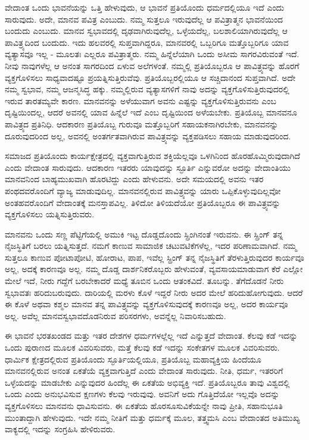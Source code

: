 ವೇದಾಂತ ಒಂದು ಭಾವನೆಯನ್ನು ಒತ್ತಿ ಹೇಳುವುದು, ಆ ಭಾವನೆ ಪ್ರತಿಯೊಂದು ಧರ್ಮದಲ್ಲಿಯೂ ಇದೆ ಎಂದು ಸಾರುವುದು. ಅದೇ, ಮಾನವ ಪವಿತ್ರ ಎಂಬುದು. ನಮ್ಮ ಸುತ್ತಲೂ ಇರುವುದೆಲ್ಲ ಆ ಪವಿತ್ರಾತ್ಮನ ಭಾವನೆಯಿಂದ ಬಂದುದು ಎಂಬುದು. ಮಾನವ ಸ್ವಭಾವದಲ್ಲಿ ದೃಢವಾಗಿರುವುದೆಲ್ಲ, ಒಳ್ಳೆಯದೆಲ್ಲ, ಬಲಶಾಲಿಯಾಗಿರುವುದೆಲ್ಲ ಆ ಪಾವಿತ್ರ್ಯದಿಂದ ಬಂದುದು. ಇದು ಹಲವರಲ್ಲಿ ಸುಪ್ತವಾಗಿದ್ದರೂ, ಮಾನವರಲ್ಲಿ ಒಬ್ಬರಿಗೂ ಮತ್ತೊಬ್ಬರಿಗೂ ಯಾವ ವ್ಯತ್ಯಾಸವೂ ಇಲ್ಲ - ಮೂಲತಃ ಎಲ್ಲರೂ ಪವಿತ್ರಾತ್ಮರು. ನಮ್ಮ ಹಿನ್ನೆಲೆಯಾಗಿ ಒಂದು ಅಸೀಮ ಸಾಗರವಿರುವಂತೆ ಇದೆ. ನೀವು ನಾವುಗಳೆಲ್ಲ ಆ ಅನಂತ ಸಾಗರದಿಂದ ಏಳುವ ಅಲೆಗಳಂತೆ. ನಮ್ಮಲ್ಲಿ ಪ್ರತಿಯೊಬ್ಬರೂ ಆ ಪಾವಿತ್ರ್ಯವನ್ನು ಹೊರಗೆ ವ್ಯಕ್ತಗೊಳಿಸಲು ಸಾಧ್ಯವಾದಷ್ಟೂ ಪ್ರಯತ್ನಿಸುತ್ತಿರುವೆವು. ಪ್ರತಿಯೊಬ್ಬರಲ್ಲಿಯೂ ಆ ಸಚ್ಚಿದಾನಂದ ಸುಪ್ತವಾಗಿದೆ. ಅದೇ ನಮ್ಮ ಸ್ವಭಾವ, ನಮ್ಮ ಆಜನ್ಮಸಿದ್ಧ ಹಕ್ಕು. ನಮ್ಮಲ್ಲಿರುವ ವ್ಯತ್ಯಾಸಗಳಿಗೆ ನಾವು ಅದನ್ನು ವ್ಯಕ್ತಗೊಳಿಸುತ್ತಿರುವುದರಲ್ಲಿ ಇರುವ ತಾರತಮ್ಯವೇ ಕಾರಣ. ಮಾನವನನ್ನು ಅಳೆಯುವಾಗ ಅವನು ಎಷ್ಟನ್ನು ವ್ಯಕ್ತಗೊಳಿಸುತ್ತಿರುವನು ಎಂಬ ದೃಷ್ಟಿಯಿಂದಲ್ಲ, ಆದರೆ ಅವನಲ್ಲಿ ಯಾವ ಹಿನ್ನೆಲೆ ಇದೆ ಎಂಬ ದೃಷ್ಟಿಯಿಂದ ಅಳೆಯಬೇಕು. ಪ್ರತಿಯೊಬ್ಬ ಮಾನವನೂ ಪಾವಿತ್ರ್ಯದ ಪ್ರತಿನಿಧಿ. ಆದಕಾರಣ ಪ್ರತಿಯೊಬ್ಬ ಗುರುವೂ ಮತ್ತೊಬ್ಬರಿಗೆ ಸಹಾಯಕನಾಗಿರಬೇಕು, ಮಾನವನನ್ನು ದೂರುವುದರಿಂದ ಅಲ್ಲ, ಅವನಲ್ಲಿ ಅಂತರ್ಗತವಾಗಿರುವ ಪಾವಿತ್ರ್ಯವನ್ನು ವ್ಯಕ್ತಪಡಿಸಲು ಸಹಾಯ ಮಾಡುವುದರಿಂದ.

ಸಮಾಜದ ಪ್ರತಿಯೊಂದು ಕಾರ್ಯಕ್ಷೇತ್ರದಲ್ಲಿ ವ್ಯಕ್ತವಾಗುತ್ತಿರುವ ಶಕ್ತಿಯೆಲ್ಲವೂ ಒಳಗಿನಿಂದ ಹೊರಹೊಮ್ಮಿರುವುದಾಗಿದೆ ಎಂದು ವೇದಾಂತ ಸಾರುವುದು. ಆದಕಾರಣ ಇತರರು ಯಾವುದನ್ನು ಸ್ಫೂರ್ತಿ ಎನ್ನುವರೋ ಅದನ್ನು ವೇದಾಂತಿಯು ಮಾನವನಿಂದ ಬಾಹ್ಯಮುಖವಾಗಿ ಹೊರಟಿದ್ದು ಎಂದು ಹೇಳುವನು. ಅದೇ ಸಮಯದಲ್ಲಿ ಅವನು ಇತರ ಪಂಥದವರೊಂದಿಗೆ ವ್ಯಾಜ್ಯ ಮಾಡುವುದಿಲ್ಲ. ಮಾನವನಲ್ಲಿರುವ ಪಾವಿತ್ರ್ಯವನ್ನು ಯಾರು ಒಪ್ಪಿಕೊಳ್ಳುವುದಿಲ್ಲವೋ ಅಂತಹವರೊಂದಿಗೆ ವೇದಾಂತಕ್ಕೆ ಮನಸ್ತಾಪವಿಲ್ಲ. ತಿಳಿದೋ ತಿಳಿಯದೆಯೋ ಪ್ರತಿಯೊಬ್ಬರೂ ಈ ಪಾವಿತ್ರ್ಯವನ್ನು ವ್ಯಕ್ತಗೊಳಿಸಲು ಯತ್ನಿಸುತ್ತಿರುವರು.

ಮಾನವನು ಒಂದು ಸಣ್ಣ ಪೆಟ್ಟಿಗೆಯಲ್ಲಿ ಅಮುಕಿ ಇಟ್ಟ ದೊಡ್ಡದೊಂದು ಸ್ಪ್ರಿಂಗಿನಂತೆ ಇರುವನು. ಈ ಸ್ಪ್ರಿಂಗ್ ತನ್ನ ನೈಜಸ್ಥಿತಿಗೆ ಬರಲು ಯತ್ನಿಸುತ್ತದೆ. ನಮಗೆ ಕಾಣುವ ಸಾಮಾಜಿಕ ಚಟುವಟಿಕೆಗಳೆಲ್ಲ, ಇದರ ಪರಿಣಾಮವಾಗಿದೆ. ನಮ್ಮ ಸುತ್ತಲೂ ಕಾಣುವ ಪೋಟಾಪೋಟಿ, ಹೋರಾಟ, ಪಾಪ, ಇವೆಲ್ಲ ಸ್ಪ್ರಿಂಗ್ ತನ್ನ ನೈಜಸ್ಥಿತಿಗೆ ತೆರಳುತ್ತಿರುವುದರ ಕಾರ್ಯವೂ ಅಲ್ಲ, ಅದಕ್ಕೆ ಕಾರಣವೂ ಅಲ್ಲ. ನಮ್ಮ ದೊಡ್ಡ ದಾರ್ಶನಿಕರೊಬ್ಬರು ಹೇಳುವಂತೆ, ವ್ಯವಸಾಯಮಾಡುವಾಗ ಕೆರೆ ಎಲ್ಲೋ ಮೇಲೆ ಇದೆ, ನೀರು ಗದ್ದೆಗೆ ಬರಬೇಕಾದರೆ ಮಧ್ಯೆ ತೂಬಿನ ಒಂದು ಆತಂಕವಿದೆ. ತೂಬನ್ನು. ತೆಗೆದೊಡನೆ ನೀರು ಸ್ವಭಾವತಃ ಹರಿದುಬರುವುದು. ದಾರಿಯಲ್ಲಿ ಮರಳು ಕೊಳೆ ಇದ್ದರೆ ನೀರು ಅದರ ಮೇಲೆ ಹರಿದುಹೋಗುವುದು. ಆದರೆ ಈ ಕೊಳೆ ಅಥವಾ ಕಶ್ಮಲ ಮಾನವ ತನ್ನ ಪಾವಿತ್ರ್ಯವನ್ನು ವ್ಯಕ್ತಗೊಳಿಸುವುದಕ್ಕೆ ಕಾರಣವೂ ಅಲ್ಲ, ಅದರ ಕಾರ್ಯವೂ ಅಲ್ಲ. ಅವೆಲ್ಲ ಮಾನವಸ್ವಭಾವದೊಡನಿರುವ ಪರಿಸರಗಳು, ಅವನ್ನೆಲ್ಲ ನಿವಾರಿಸಬಹುದು.

ಈ ಭಾವನೆ ಭರತಖಂಡದ ಮತ್ತು ಇತರ ದೇಶಗಳ ಧರ್ಮಗಳಲ್ಲೆಲ್ಲ ಇದೆ ಎನ್ನುತ್ತದೆ ವೇದಾಂತ. ಕೆಲವು ಕಡೆ ಇದನ್ನು ಒಂದು ಪುರಾಣದ ಮೂಲಕ ವಿವರಿಸುವರು, ಮತ್ತೆ ಕೆಲವು ಕಡೆ ಇದನ್ನು ಸಂಕೇತಗಳ ಮೂಲಕ ವಿವರಿಸುವರು. ಧಾರ್ಮಿಕ ಕ್ಷೇತ್ರದಲ್ಲಿರುವ ಪ್ರತಿಯೊಂದು ಸ್ಫೂರ್ತಿಯಲ್ಲಿಯೂ, ಪ್ರತಿಯೊಬ್ಬ ಮಹಾವ್ಯಕ್ತಿಯ ಹಿಂದೆಯೂ ಮಾನವನಲ್ಲಿರುವ ಅನಂತ ಏಕತೆಯೆ ವ್ಯಕ್ತವಾಗುತ್ತಿದೆ ಎಂದು ವೇದಾಂತ ಸಾರುವುದು. ನೀತಿ, ಧರ್ಮ, ಇತರರಿಗೆ ಒಳ್ಳೆಯದನ್ನು ಮಾಡಬೇಕು ಎನ್ನುವುದರ ಹಿಂದೆಲ್ಲ ಈ ಏಕತೆಯ ಅಭಿವ್ಯಕ್ತಿ ಇದೆ. ಪ್ರತಿಯೊಬ್ಬರೂ ತಾವು ವಿಶ್ವದಲ್ಲಿ ಒಂದು ಎಂದು ಅನುಭವಿಸುವ ಕ್ಷಣಗಳು ಕೆಲವು ಇರುವುವು. ಅವನಿಗೆ ಅದು ಗೊತ್ತಿದೆಯೋ ಇಲ್ಲವೊ ಅದನ್ನು ವ್ಯಕ್ತಗೊಳಿಸಲು ಮಾನವನು ಧಾವಿಸುವನು. ಈ ಏಕತೆಯ ಹೊರಸೂಸುವಿಕೆಯನ್ನೇ ನಾವು ಪ್ರೀತಿ, ಸಹಾನುಭೂತಿ ಮುಂತಾದ್ದಾಗಿ ಹೇಳುವುದು. ಇದೇ ನಮ್ಮ ನೀತಿಗೆ ಮತ್ತು ಧರ್ಮಕ್ಕೆ ಮೂಲ, ತತ್ತ್ವಮಸಿ ಎಂಬ ವೇದಾಂತದ ಅತಿಮುಖ್ಯ ವಾಕ್ಯದಲ್ಲಿ ಇದನ್ನು ಸಂಗ್ರಹಿಸಿ ಹೇಳಿರುವರು.

